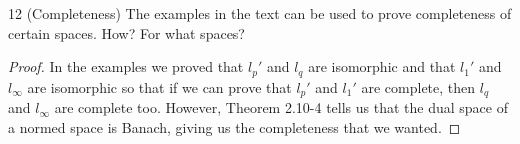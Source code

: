 \begin{exercise}{12 (Completeness)}
The examples in the text can be used to prove completeness of certain spaces.
How?
For what spaces?
\end{exercise}
\begin{proof}
In the examples we proved that $l_p'$ and $l_q$ are isomorphic and that $l_1'$ and $l_\infty$ are isomorphic so that if we can prove that $l_p'$ and $l_1'$ are complete, then $l_q$ and $l_\infty$ are complete too.
However, Theorem 2.10-4 tells us that the dual space of a normed space is Banach, giving us the completeness that we wanted.
\end{proof}
